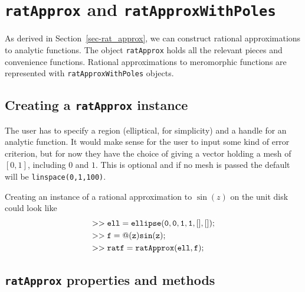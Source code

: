 \section{{\tt ratApprox} and {\tt ratApproxWithPoles}}
\label{sec-ratApprox}

As derived in Section~\ref{sec-rat_approx}, we can construct
rational approximations to analytic functions. The object
{\tt ratApprox} holds all the relevant pieces and convenience functions.
Rational approximations to meromorphic functions are represented with
{\tt ratApproxWithPoles} objects.

\subsection{Creating a {\tt ratApprox} instance}

The user has to specify a region (elliptical, for simplicity) and
a handle for an analytic function. 
It would make sense for the user to input some
kind of error criterion, but for now they have the choice of giving a
vector holding a mesh of $[0,1]$, including $0$ and $1$. This is optional
and if no mesh is passed the default will be {\tt linspace(0,1,100)}.

Creating an instance of a rational approximation to $\sin(z)$ on
the unit disk could look like
\begin{equation}
\begin{aligned}
 &{\tt >> ell = ellipse(0,0,1,1,[],[]);} \\ 
 &{\tt >> f = @(z) sin(z);} \\ 
 &{\tt >> ratf = ratApprox(ell,f);}
\end{aligned}
\end{equation}

\subsection{{\tt ratApprox} properties and methods}

